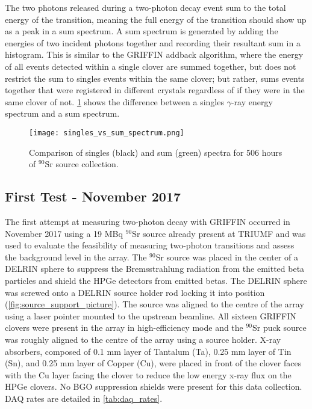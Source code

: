 \documentclass[cnatzke_thesis_proposal.tex]{subfiles}
\begin{document}
The two photons released during a two-photon decay event sum to the total energy of the transition, meaning the full energy of the transition should show up as a peak in a sum spectrum. 
A sum spectrum is generated by adding the energies of two incident photons together and recording their resultant sum in a histogram.
This is similar to the GRIFFIN addback algorithm, where the energy of all events detected within a single clover are summed together, but does not restrict the sum to singles events within the same clover; but rather, sums events together that were registered in different crystals regardless of if they were in the same clover of not. 
\ref{fig:singles_vs_sum_spectrum} shows the difference between a singles $\gamma$-ray energy spectrum and a sum spectrum.

\begin{figure}[htbp]
  \centering
  \texttt{[image: singles\_vs\_sum\_spectrum.png]}
  \caption{Comparison of singles (black) and sum (green) spectra for 506 hours of $^{90}$Sr source collection.}
  \label{fig:singles_vs_sum_spectrum}
\end{figure}

\subsection{First Test - November 2017}
The first attempt at measuring two-photon decay with GRIFFIN occurred in November 2017 using a 19 MBq $^{90}$Sr source already present at TRIUMF and was used to evaluate the feasibility of measuring two-photon transitions and assess the background level in the array.
The $^{90}$Sr source was placed in the center of a DELRIN sphere to suppress the Bremsstrahlung radiation from the emitted beta particles and shield the HPGe detectors from emitted betas.
The DELRIN sphere was screwed onto a DELRIN source holder rod locking it into position (\ref{fig:source_support_picture}).
The source was aligned to the centre of the array using a laser pointer mounted to the upstream beamline.
All sixteen GRIFFIN clovers were present in the array in high-efficiency mode and the $^{90}$Sr puck source was roughly aligned to the centre of the array using a source holder.
X-ray absorbers, composed of 0.1 mm layer of Tantalum (Ta), 0.25 mm layer of Tin (Sn), and 0.25 mm layer of Copper (Cu), were placed in front of the clover faces with the Cu layer facing the clover to reduce the low energy x-ray flux on the HPGe clovers.
No BGO suppression shields were present for this data collection. 
DAQ rates are detailed in \ref{tab:daq_rates}.
\end{document}
